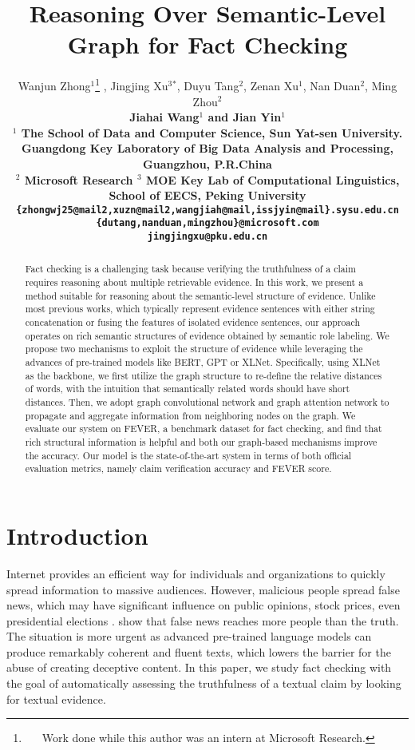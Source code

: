 \documentclass[11pt,a4paper]{article}
\title{Reasoning Over Semantic-Level Graph for Fact Checking}
\author{Wanjun Zhong$^1$\thanks{\ \ \ Work done while this author was an intern at Microsoft Research.} , Jingjing Xu$^3$$^*$, Duyu Tang$^2$, Zenan Xu$^1$, Nan Duan$^2$, Ming Zhou$^2$\\
	\bf Jiahai Wang$^1$ and Jian Yin$^1$\\
	$^1$ The School of Data and Computer Science, Sun Yat-sen University.\\
	Guangdong Key Laboratory of Big Data Analysis and Processing, Guangzhou, P.R.China\\
	$^2$ Microsoft Research $^3$ MOE Key Lab of Computational Linguistics, School of EECS, Peking University\\
	{\tt \{zhongwj25@mail2,xuzn@mail2,wangjiah@mail,issjyin@mail\}.sysu.edu.cn}\\
	{\tt \{dutang,nanduan,mingzhou\}@microsoft.com}\\ 
	{\tt jingjingxu@pku.edu.cn}\\
}
\date{}
\begin{document}
\maketitle
\begin{abstract}
Fact checking is a challenging task because verifying the truthfulness of a claim requires reasoning about multiple retrievable {evidence}. In this work, we present a method suitable for reasoning about the semantic-level structure of evidence. Unlike most previous {works}, which typically {represent} evidence sentences with either string concatenation or fusing the features of isolated evidence sentences, our approach operates on rich semantic structures of evidence obtained by semantic role labeling. We propose two mechanisms to exploit the structure of evidence while leveraging the advances of pre-trained models like BERT, \mbox{GPT} or XLNet. Specifically, using XLNet as the backbone, we first utilize the graph structure to re-define the relative distances of words, with the intuition that semantically related words should have short distances. Then, we adopt graph convolutional network and graph attention network to propagate and aggregate information from neighboring nodes on the graph. We evaluate our system on FEVER, a benchmark dataset for fact checking, and find that rich structural information is helpful and both our graph-based mechanisms improve the accuracy. Our model is the state-of-the-art system in terms of both official evaluation metrics, namely claim verification accuracy and FEVER score.
\end{abstract}

\section{Introduction}
Internet provides an efficient way for individuals and organizations to quickly spread information to massive audiences. 
However, 
malicious people spread false news, which may have significant influence on public opinions, stock prices, even presidential elections \cite{faris2017partisanship}.
 show that false news reaches more people than the truth.
The situation is more urgent as advanced pre-trained language models \cite{radford2019language} can produce remarkably coherent and fluent texts, which lowers the barrier for the abuse of creating deceptive content.
In this paper, we study fact checking
with the goal of automatically 
assessing the truthfulness
of a textual claim by looking for textual evidence.  
\end{document}
